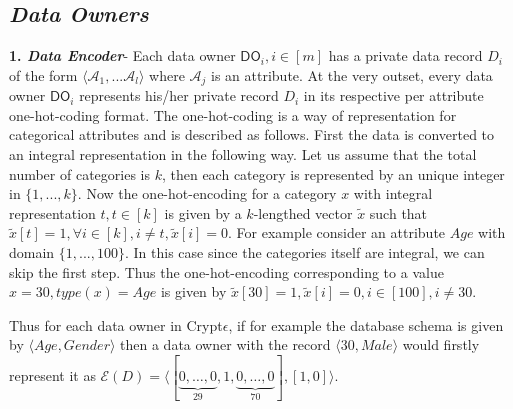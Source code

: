 \subsection*{\textit{Data Owners}}
\textbf{1. \textit{Data Encoder}}-  Each data owner $\textsf{DO}_i, i \in [m]$ has a private data record $D_i$ of the form $\langle \mathcal{A}_1,...\mathcal{A}_l\rangle$ where $\mathcal{A}_j$ is an attribute. At the very outset, every data owner  $\textsf{DO}_i$ represents his/her private record $D_i$ in its respective per attribute one-hot-coding format. The one-hot-coding is a way of representation for categorical attributes and is described as follows. First the data is converted to an integral representation in the following way. Let us assume that the total number of categories is $k$, then each category is represented by an unique integer in $\{1,..., k\}$. Now the one-hot-encoding for a category $x$ with integral representation $t , t \in [k]$ is given by a $k$-lengthed vector $\tilde{x}$ such that $\tilde{x}[t]=1, \forall i \in [k], i\neq t, \tilde{x}[i]=0$. 
For example consider an attribute $Age$ with domain $\{1,...,100\}$. In this case since the categories itself are integral, we can skip the first step. Thus the one-hot-encoding corresponding to a value $x=30, type(x)=Age$ is given by $\tilde{x}[30]=1, \tilde{x}[i]=0, i \in [100], i \neq 30 $. 
Thus for each data owner in Crypt$\epsilon$, if for example  the database schema is given by  $\langle Age,Gender\rangle$ then a data owner with the record $\langle 30, Male\rangle$ would firstly represent it as $\mathcal{E}(D)=\langle[\underbrace{0,\ldots,0}_{29},1,\underbrace{0,\ldots,0}_{70}],[1,0]\rangle$. \\
